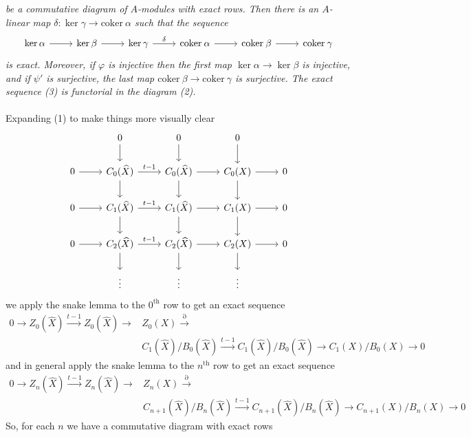 \documentclass{article}
\newcommand{\coker}{\text{coker}\:}
\begin{document}
\textit{be a commutative diagram of $A$-modules with exact rows. Then there is an $A$-linear map $\delta: \ker \gamma \to \coker \alpha$ such that the sequence} 
\begin{equation}
\begin{tikzcd}
\ker \alpha \ar[r] &\ker \beta \ar[r] &\ker \gamma \ar[r, "\delta"] &\coker \alpha \ar[r] &\coker \beta \ar[r] &\coker \gamma
\end{tikzcd}
\end{equation}
\textit{is exact. Moreover, if $\varphi$ is injective then the first map $\ker \alpha \to \ker \beta$ is injective, and if $\psi'$ is surjective, the last map $\coker \beta \to \coker \gamma$ is surjective. 
The exact sequence (3) is functorial in the diagram (2).} \\ \\
Expanding (1) to make things more visually clear
\begin{equation}
\begin{tikzcd}
&0 \ar[d] &0 \ar[d] &0 \ar[d] \\
0 \ar[r] &C_0(\widehat{X}) \ar[d] \ar[r, "t-1"] &C_0(\widehat{X}) \ar[d] \ar[r] &C_0(X) \ar[d] \ar[r] &0 \\
0 \ar[r] &C_1(\widehat{X}) \ar[d] \ar[r, "t-1"] &C_1(\widehat{X}) \ar[d] \ar[r] &C_1(X) \ar[d] \ar[r] &0 \\
0 \ar[r] &C_2(\widehat{X}) \ar[d] \ar[r, "t-1"] &C_2(\widehat{X}) \ar[d] \ar[r] &C_2(X) \ar[d] \ar[r] &0 \\
&\vdots &\vdots &\vdots
\end{tikzcd}
\end{equation}
we apply the snake lemma to the $0^{\text{th}}$ row to get an exact sequence 
\begin{align*}
0 \to Z_0(\widehat{X}) \xrightarrow{t-1} Z_0(\widehat{X}) \to &Z_0(X) \xrightarrow{\partial} \\ &C_1(\widehat{X})/B_0(\widehat{X}) \xrightarrow{t-1} C_1(\widehat{X})/B_0(\widehat{X}) \to C_1(X) / B_0(X) \to 0 
\end{align*}
and in general apply the snake lemma to the $n^{\text{th}}$ row to get an exact sequence 
\begin{align*}
0 \to Z_n(\widehat{X}) \xrightarrow{t-1} Z_n(\widehat{X}) \to &Z_n(X) \xrightarrow{\partial} \\ &C_{n+1}(\widehat{X})/B_n(\widehat{X}) \xrightarrow{t-1} C_{n+1}(\widehat{X})/B_n(\widehat{X}) \to C_{n+1}(X) / B_n(X) \to 0 
\end{align*}
So, for each $n$ we have a commutative diagram with exact rows 
\end{document}
